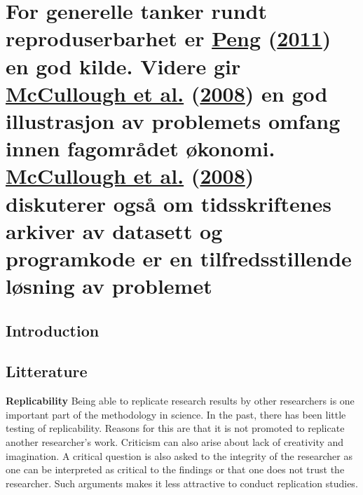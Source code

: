 \documentclass[
  12pt,
  norsk,
]{article}
\begin{document}
\hypertarget{for-generelle-tanker-rundt-reproduserbarhet-er-peng2011-en-god-kilde.-videre-gir-mccullough2008-en-god-illustrasjon-av-problemets-omfang-innen-fagomruxe5det-uxf8konomi.-mccullough2008-diskuterer-ogsuxe5-om-tidsskriftenes-arkiver-av-datasett-og-programkode-er-en-tilfredsstillende-luxf8sning-av-problemet}{%
\section{\texorpdfstring{For generelle tanker rundt reproduserbarhet er
\protect\hyperlink{ref-peng2011}{Peng}
(\protect\hyperlink{ref-peng2011}{2011}) en god kilde. Videre gir
\protect\hyperlink{ref-mccullough2008}{McCullough et al.}
(\protect\hyperlink{ref-mccullough2008}{2008}) en god illustrasjon av
problemets omfang innen fagområdet økonomi.
\protect\hyperlink{ref-mccullough2008}{McCullough et al.}
(\protect\hyperlink{ref-mccullough2008}{2008}) diskuterer også om
tidsskriftenes arkiver av datasett og programkode er en
tilfredsstillende løsning av
problemet}{For generelle tanker rundt reproduserbarhet er Peng (2011) en god kilde. Videre gir McCullough et al. (2008) en god illustrasjon av problemets omfang innen fagområdet økonomi. McCullough et al. (2008) diskuterer også om tidsskriftenes arkiver av datasett og programkode er en tilfredsstillende løsning av problemet}}\label{for-generelle-tanker-rundt-reproduserbarhet-er-peng2011-en-god-kilde.-videre-gir-mccullough2008-en-god-illustrasjon-av-problemets-omfang-innen-fagomruxe5det-uxf8konomi.-mccullough2008-diskuterer-ogsuxe5-om-tidsskriftenes-arkiver-av-datasett-og-programkode-er-en-tilfredsstillende-luxf8sning-av-problemet}}

\hypertarget{introduction-1}{%
\subsection{Introduction}\label{introduction-1}}

\hypertarget{litterature}{%
\subsection{Litterature}\label{litterature}}

\textbf{Replicability} Being able to replicate research results by other
researchers is one important part of the methodology in science. In the
past, there has been little testing of replicability. Reasons for this
are that it is not promoted to replicate another researcher's work.
Criticism can also arise about lack of creativity and imagination. A
critical question is also asked to the integrity of the researcher as
one can be interpreted as critical to the findings or that one does not
trust the researcher. Such arguments makes it less attractive to conduct
replication studies.
\end{document}
